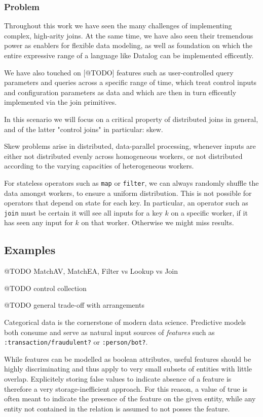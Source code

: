 \documentclass[../catalog.tex]{subfiles}
\begin{document}
\subsubsection{Problem}

Throughout this work we have seen the many challenges of implementing
complex, high-arity joins. At the same time, we have also seen their
tremendous power as enablers for flexible data modeling, as well as
foundation on which the entire expressive range of a language like
Datalog can be implemented efficently.

We have also touched on [@TODO] features such as user-controlled query
parameters and queries across a specific range of time, which treat
control inputs and configuration parameters as data and which are then
in turn efficently implemented via the join primitives.

In this scenario we will focus on a critical property of distributed
joins in general, and of the latter "control joins" in particular:
skew.

Skew problems arise in distributed, data-parallel processing, whenever
inputs are either not distributed evenly across homogeneous workers,
or not distributed according to the varying capacities of
heterogeneous workers.

For stateless operators such as \texttt{map} or \texttt{filter}, we
can always randomly shuffle the data amongst workers, to ensure a
uniform distribution. This is not possible for operators that depend
on state for each key. In particular, an operator such as
\texttt{join} must be certain it will see all inputs for a key $k$ on
a specific worker, if it has seen any input for $k$ on that
worker. Otherwise we might miss results.

\subsection{Examples}

@TODO MatchAV, MatchEA, Filter vs Lookup vs Join

@TODO control collection

@TODO general trade-off with arrangements

Categorical data is the cornerstone of modern data science. Predictive
models both consume and serve as natural input sources of
\emph{features} such as \texttt{:transaction/fraudulent?} or
\texttt{:person/bot?}.

While features can be modelled as boolean attributes, useful features
should be highly discriminating and thus apply to very small subsets
of entities with little overlap. Explicitely storing false values to
indicate absence of a feature is therefore a very storage-inefficient
approach. For this reason, a value of true is often meant to indicate
the presence of the feature on the given entity, while any entity not
contained in the relation is assumed to not posses the feature.
\end{document}
